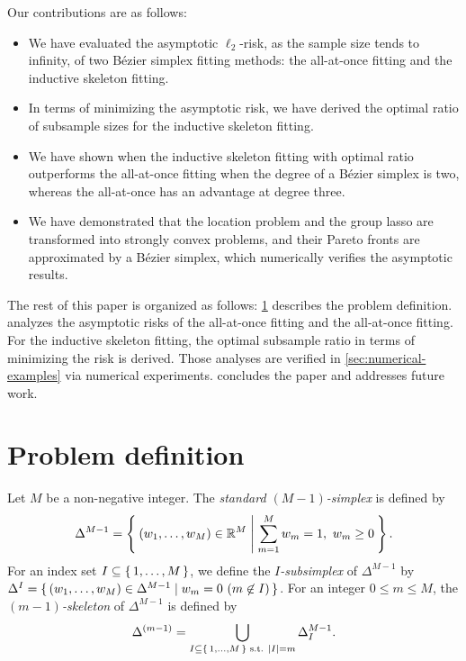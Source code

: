\documentclass{article}
\begin{document}
Our contributions are as follows:
\begin{itemize}
\item We have evaluated the asymptotic $\ell_2$-risk, as the sample size tends to infinity, of two B\'ezier simplex fitting methods: the all-at-once fitting and the inductive skeleton fitting.
\item In terms of minimizing the asymptotic risk, we have derived the optimal ratio of subsample sizes for the inductive skeleton fitting.
\item We have shown when the inductive skeleton fitting with optimal ratio outperforms the all-at-once fitting when the degree of a B\'ezier simplex is two, whereas the all-at-once has an advantage at degree three.
\item We have demonstrated that the location problem and the group lasso are transformed into strongly convex problems, and their Pareto fronts are approximated by a B\'ezier simplex, which numerically verifies the asymptotic results.
\end{itemize}

The rest of this paper is organized as follows:
\cref{sec:problem-definition} describes the problem definition.
 analyzes the asymptotic risks of the all-at-once fitting and the all-at-once fitting.
For the inductive skeleton fitting, the optimal subsample ratio in terms of minimizing the risk is derived.
Those analyses are verified in \cref{sec:numerical-examples} via numerical experiments.
 concludes the paper and addresses future work.

\section{Problem definition}\label{sec:problem-definition}
Let $M$ be a non-negative integer.
The \emph{standard $(M - 1)$-simplex} is defined by
\[
\Delta^{M - 1} = \Set{(w_1, \dots, w_M) \in \mathbb{R}^M | \sum_{m = 1}^M w_m = 1,\ w_m \geq 0}.
\]
For an index set $I \subseteq \set{1, \dots, M}$, we define the \emph{$I$-subsimplex} of $\Delta^{M - 1}$ by $\Delta^I = \set{(w_1, \dots, w_M) \in \Delta^{M - 1} | w_m = 0\ (m \not \in I)}$.
For an integer $0 \leq m \leq M$, the \emph{$(m - 1)$-skeleton} of $\Delta^{M - 1}$ is defined by
\[
\Delta^{(m-1)} = \bigcup_{I \subseteq \set{1, \dots, M} \text{ s.t. } \left| I \right|=m} \Delta^{M-1}_I.
\]
\end{document}
